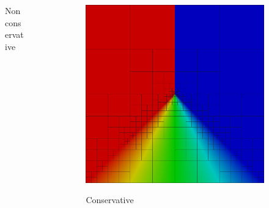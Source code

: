 \documentclass{beamer}
\begin{document}
\begin{frame}
{\begin{columns}
\begin{column}{0.49\textwidth}
\begin{figure}
Nonconservative
\end{figure}
\end{column}
\begin{column}{0.49\textwidth}
\begin{figure}
\centering
\includegraphics[width=1.0\textwidth]{Burgers/graph8c.png}

Conservative
\end{figure}
\end{column}
\end{columns}
}
\end{frame}
\end{document}
